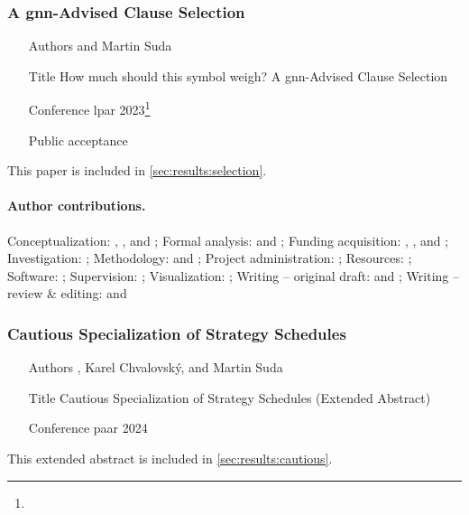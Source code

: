 \subsubsection{A \acrshort{gnn}-Advised Clause Selection}

\begin{itemize}
\item[Authors]  and Martin Suda
\item[Title] How much should this symbol weigh? A \acrshort{gnn}-Advised Clause Selection~\cite{DBLP:conf/lpar/Bartek023}
\item[Conference] \Acrfull{lpar} 2023\footnote{}
\item[Public acceptance] 
\end{itemize}

This paper is included in \cref{sec:results:selection}.

\paragraph{Author contributions.}
Conceptualization:            \MS{}, \FB{}, and \CK{};
Formal analysis:              \FB{} and \MS{};
Funding acquisition:          \MS{}, \JU{}, and \FB{};
Investigation:                \FB{};
Methodology:                  \FB{} and \MS{};
Project administration:       \MS{};
Resources:                    \JU{};
Software:                     \FB{};
Supervision:                  \MS{};
Visualization:                \FB{};
Writing -- original draft:    \FB{} and \MS{};
Writing -- review \& editing: \FB{} and \MS{}

\subsubsection{Cautious Specialization of Strategy Schedules}

\begin{itemize}
\item[Authors] , Karel Chvalovský, and Martin Suda
\item[Title] Cautious Specialization of Strategy Schedules (Extended Abstract) \cite{DBLP:conf/paar/BartekC024}
\item[Conference] \Acrfull{paar} 2024
\end{itemize}

This extended abstract is included in \cref{sec:results:cautious}.

